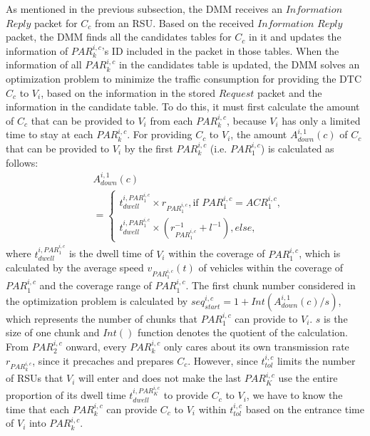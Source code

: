\documentclass{ieeeaccess}
\begin{document}
As mentioned in the previous subsection, the DMM receives an $Information$ $Reply$ packet for $C_{c}$ from an RSU.
Based on the received $Information$ $Reply$ packet, the DMM finds all the candidates tables for $C_{c}$ in it and updates the information of $PAR^{i,c}_{k}$'s ID included in the packet in those tables.
When the information of all $PAR^{i,c}_{k}$ in the candidates table is updated, the DMM solves an optimization problem to minimize the traffic consumption for providing the DTC $C_{c}$ to $V_{i}$, based on the information in the stored $Request$ packet and the information in the candidate table.
To do this, it must first calculate the amount of $C_{c}$ that can be provided to $V_{i}$ from each $PAR^{i,c}_{k}$, because $V_{i}$ has only a limited time to stay at each $PAR^{i,c}_{k}$.
For providing $C_{c}$ to $V_{i}$, the amount $A_{down}^{i, 1}(c)$ of $C_{c}$ that can be provided to $V_{i}$ by the first $PAR^{i,c}_{k}$ (i.e. $PAR^{i,c}_{1}$)  is calculated as follows:
\begin{equation} %
    \begin{split}
        & A_{down}^{i, 1}(c)\\ & = \begin{cases*}
            t_{dwell}^{i, PAR^{i,c}_{1}} \times r_{PAR^{i,c}_{1}}, \text{if $PAR^{i,c}_{1}=ACR^{i,c}_{1}$},\\
            t_{dwell}^{i, PAR^{i,c}_{1}} \times \left(r_{PAR^{i,c}_{1}}^{-1}+ l^{-1} \right), else,
        \end{cases*} \label{eq:b}
    \end{split}
\end{equation}
where $t_{dwell}^{i, PAR^{i,c}_{1}}$ is the dwell time of $V_{i}$ within the coverage of $PAR^{i,c}_{1}$, which is calculated by the average speed $v_{PAR^{i,c}_{1}}(t)$ of vehicles within the coverage of $PAR^{i,c}_{1}$ and the coverage range of $PAR^{i,c}_{1}$.
The first chunk number considered in the optimization problem is calculated by $seq_{start}^{i,c}=1+Int(A_{down}^{i, 1}(c)/s)$, which represents the number of chunks that $PAR^{i,c}_{1}$ can provide to $V_{i}$.
$s$ is the size of one chunk and $Int()$ function denotes the quotient of the calculation.
From $PAR^{i,c}_{2}$ onward, every $PAR^{i,c}_{k}$ only cares about its own transmission rate $r_{PAR^{i,c}_{k}}$, since it precaches and prepares $C_{c}$.
However, since $t^{i,c}_{tol}$ limits the number of RSUs that $V_{i}$ will enter and does not make the last $PAR^{i,c}_{K}$ use the entire proportion of its dwell time $t^{i,PAR^{i,c}_{K}}_{dwell}$ to provide $C_{c}$ to $V_{i}$, we have to know the time that each $PAR^{i,c}_{k}$ can provide $C_{c}$ to $V_{i}$ within $t^{i,c}_{tol}$ based on the entrance time of $V_{i}$ into $PAR^{i,c}_{k}$.
\end{document}
